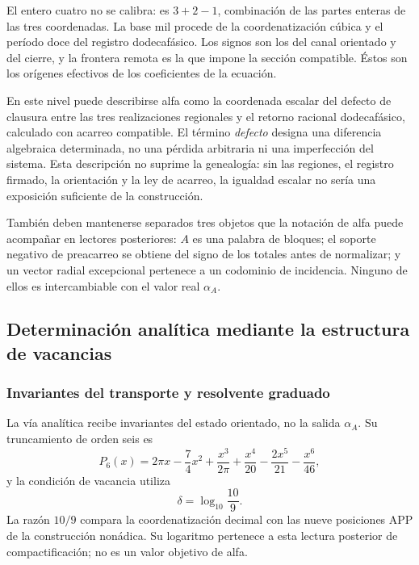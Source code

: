 El entero cuatro no se calibra: es
\(3+2-1\), combinación de las partes enteras de las tres coordenadas.
La base mil procede de la coordenatización cúbica y el período doce del registro dodecafásico. Los
signos son los del canal orientado y del cierre, y la frontera remota es
la que impone la sección compatible. Éstos son los orígenes efectivos de
los coeficientes de la ecuación.

En este nivel puede describirse alfa como la coordenada escalar del
defecto de clausura entre las tres realizaciones regionales y el retorno
racional dodecafásico, calculado con acarreo compatible. El término
\emph{defecto} designa una diferencia algebraica determinada, no una
pérdida arbitraria ni una imperfección del sistema. Esta descripción no
suprime la genealogía: sin las regiones, el registro firmado, la
orientación y la ley de acarreo, la igualdad escalar no sería una
exposición suficiente de la construcción.

También deben mantenerse separados tres objetos que la notación de alfa
puede acompañar en lectores posteriores: \(A\) es una palabra de
bloques; el soporte negativo de preacarreo se obtiene del signo de los
totales antes de normalizar; y un vector radial excepcional pertenece a
un codominio de incidencia. Ninguno de ellos es intercambiable con el
valor real \(\alpha_A\).






\subsection{Determinación analítica mediante la estructura de vacancias}
\subsubsection{Invariantes del transporte y resolvente graduado}
\label{subsec:alpha-via-b}

La vía analítica recibe invariantes del estado orientado, no la salida
\(\alpha_A\). Su truncamiento de orden seis es
\begin{equation}
 P_6(x)=2\pi x-\frac74x^2
 +\frac{x^3}{2\pi}
 +\frac{x^4}{20}-\frac{2x^5}{21}-\frac{x^6}{46},
 \label{eq:alpha-p6}
\end{equation}
y la condición de vacancia utiliza
\[
 \delta=\log_{10}\frac{10}{9}.
\]
La razón \(10/9\) compara la coordenatización decimal con las nueve posiciones
APP de la construcción nonádica. Su logaritmo pertenece a esta lectura
posterior de compactificación; no es un valor objetivo de alfa.

